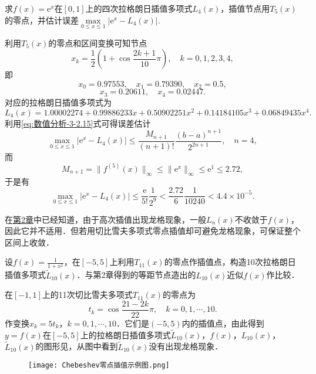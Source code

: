 \documentclass[../../main.tex]{subfiles}
\begin{document}
\begin{example}
求$f(x) = \mathrm{e}^x$在$[0,1]$上的四次拉格朗日插值多项式$L_4(x)$，插值节点用$T_5(x)$的零点，并估计误差$\max\limits_{0 \leqslant x \leqslant 1} |\mathrm{e}^x - L_4(x)|$.
\end{example}
\begin{solution}
利用$T_5(x)$的零点和区间变换可知节点
$$x_k = \frac{1}{2}\left(1 + \cos\frac{2k+1}{10}\pi\right),\quad k = 0,1,2,3,4,$$
即
$$x_0 = 0.97553,\quad x_1 = 0.79390,\quad x_2 = 0.5,$$
$$x_3 = 0.20611,\quad x_4 = 0.02447.$$
对应的拉格朗日插值多项式为
$$L_4(x) = 1.00002274 + 0.99886233x + 0.50902251x^2 + 0.14184105x^3 + 0.06849435x^4.$$
利用\eqref{eq:数值分析-3-2.15}式可得误差估计
$$\max\limits_{0 \leqslant x \leqslant 1} |\mathrm{e}^x - L_4(x)| \leqslant \frac{M_{n+1}}{(n+1)!} \frac{(b - a)^{n+1}}{2^{2n+1}},\quad n = 4,$$
而
$$M_{n+1} = \|f^{(5)}(x)\|_\infty \leqslant \|\mathrm{e}^x\|_\infty \leqslant \mathrm{e}^1 \leqslant 2.72,$$
于是有
$$\max\limits_{0 \leqslant x \leqslant 1} |\mathrm{e}^x - L_4(x)| \leqslant \frac{\mathrm{e}}{5!} \frac{1}{2^9} < \frac{2.72}{6} \frac{1}{10240} < 4.4 \times 10^{-5}.$$

\end{solution}

在\hyperref[高次插值导致的龙格现象]{第2章}中已经知道，由于高次插值出现龙格现象，一般$L_n(x)$不收敛于$f(x)$，因此它并不适用．但若用切比雪夫多项式零点插值却可避免龙格现象，可保证整个区间上收敛．

\begin{example}
设$f(x) = \frac{1}{1 + x^2}$，在$[-5,5]$上利用$T_{11}(x)$的零点作插值点，构造10次拉格朗日插值多项式$\widetilde{L}_{10}(x)$．与第2章得到的等距节点造出的$L_{10}(x)$近似$f(x)$作比较．
\end{example}
\begin{solution}
在$[-1,1]$上的11次切比雪夫多项式$T_{11}(x)$的零点为
$$t_k = \cos\frac{21 - 2k}{22}\pi,\quad k = 0,1,\cdots,10.$$
作变换$x_k = 5t_k$，$k = 0,1,\cdots,10$．它们是$(-5,5)$内的插值点，由此得到$y = f(x)$在$[-5,5]$上的拉格朗日插值多项式$\widetilde{L}_{10}(x)$，$f(x)$，$L_{10}(x)$，$\widetilde{L}_{10}(x)$的图形见，从图中看到$\widetilde{L}_{10}(x)$没有出现龙格现象．
\begin{figure}[H]
\centering
\texttt{[image: Chebeshev零点插值示例图.png]}
\caption{}
\label{figure:Chebeshev零点插值示例图}
\end{figure}

\end{solution}
\end{document}
